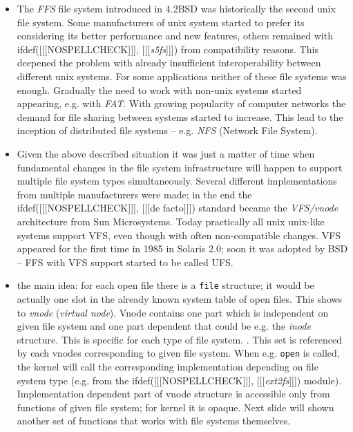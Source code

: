 \begin{itemize}
\item The \emph{FFS} file system introduced in 4.2BSD was historically the
second unix file system. Some manufacturers of unix system started to prefer its
considering its better performance and new features, others remained with
ifdef([[[NOSPELLCHECK]]], [[[\emph{s5fs}]]]) from compatibility reasons. This
deepened the problem with already insufficient interoperability between
different unix systems. For some
applications neither of these file systems was enough. Gradually the need to
work with non-unix systems started appearing, e.g. with \emph{FAT}. With growing
popularity of computer networks the demand for file sharing between systems
started to increase. This lead to the inception of distributed file systems
-- e.g. \emph{NFS} (Network File System).
\item Given the above described situation it was just a matter of time when
fundamental changes in the file system infrastructure will happen to support
multiple file system types simultaneously. Several different implementations
from multiple manufacturers were made; in the end the ifdef([[[NOSPELLCHECK]]],
[[[de facto]]]) standard became
the \emph{VFS/vnode} architecture from Sun Microsystems. Today practically all
unix u{}nix-like systems support VFS, even though with often non-compatible
changes. VFS appeared for the first time in 1985 in Solaris 2.0;
soon it was adopted by BSD -- FFS with VFS support started to be called UFS.
\item the main idea: for each open file there is a \texttt{file} structure;
it would be actually one slot in the already known system table of open files.
This shows to \emph{vnode} (\emph{virtual node}). Vnode contains one part which
is independent on given file system and one part dependent that could be e.g.
the \emph{inode} structure. This is specific for each type of file system.
. This set is referenced by each vnodes corresponding to given
file system.  When e.g.
\texttt{open} is called, the kernel will call the corresponding implementation
depending on file system type (e.g. from the ifdef([[[NOSPELLCHECK]]],
[[[\emph{ext2fs}]]]) module).
Implementation dependent part of vnode structure is accessible only from
functions of given file system; for kernel it is opaque. Next slide will shown
another set of functions that works with file systems themselves.

\end{itemize}
